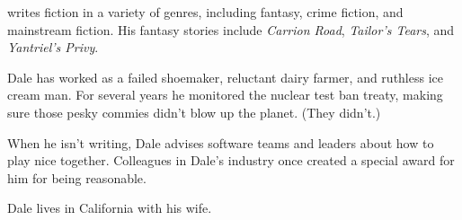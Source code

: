 \nextoddpage
{}

\bigskip
{}
writes fiction in a variety of genres,
including fantasy, crime fiction, and mainstream fiction.
His fantasy stories include
\emph{Carrion Road},
\emph{Tailor's Tears},
and \emph{Yantriel's Privy}.

Dale has worked as a failed shoemaker,
reluctant dairy farmer,
and ruthless ice cream man.
For several years
he monitored the nuclear test ban treaty,
making sure those pesky commies didn't blow up the planet.
(They didn't.)

When he isn't writing,
Dale advises software teams and leaders
about how to play nice together.
Colleagues in Dale's industry
once created a special award for him
for being reasonable.

Dale lives in California with his wife.
